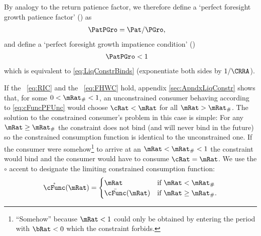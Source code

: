 \documentclass[BufferStockTheory]{subfiles}
\begin{document}
\hypertarget{PFGPF}{}
\hypertarget{PFGIC}{}
By analogy to the return patience factor, we therefore define a `perfect
foresight growth patience factor' (\PFGPF) as
\begin{equation}\begin{gathered}\begin{aligned}
  \PatPGro  & = {\Pat}/\PGro,  \label{eq:PFGPF}
\end{aligned}\end{gathered}\end{equation}
and define a `perfect foresight growth impatience condition' (\PFGIC)
\begin{equation}\begin{gathered}\begin{aligned}
  \label{eq:PFGIC}
  \PatPGro &  < 1
\end{aligned}\end{gathered}\end{equation}
which is equivalent to \eqref{eq:LiqConstrBinds} (exponentiate both
sides by $1/\CRRA$).

If the \RIC~\eqref{eq:RIC} and the \FHWC~\eqref{eq:FHWC} hold, appendix \ref{sec:ApndxLiqConstr} shows
that, for some $0 < \mRat_{\#} < 1$, an unconstrained consumer behaving according to
\eqref{eq:cFuncPFUnc} would choose $\cRat < \mRat$ for all $\mRat >
\mRat_{\#}$.  The solution to the
constrained consumer's problem in this case is simple: For any $\mRat
\geq \mRat_{\#}$ the constraint does not bind (and will never bind in
the future) so the constrained consumption function is identical
to the unconstrained one.  If the consumer were somehow\footnote{``Somehow'' because $\mRat<1$ could only be
  obtained by entering the period with $\bRat < 0$ which the constraint
  forbids.}
to arrive at an $\mRat < \mRat_{\#} < 1$ the constraint would bind and
the consumer would have to consume $\cRat=\mRat$.  We use the $\circ$ accent to designate the limiting
constrained consumption function:
\begin{equation}
  \mathring{\cFunc}(\mRat)=
  \begin{cases}
    \mRat & \text{if $\mRat < \mRat_{\#}$} \\
    \bar{\cFunc}(\mRat)  & \text{if $\mRat \geq \mRat_{\#}$.}
  \end{cases}
\end{equation}
\end{document}
